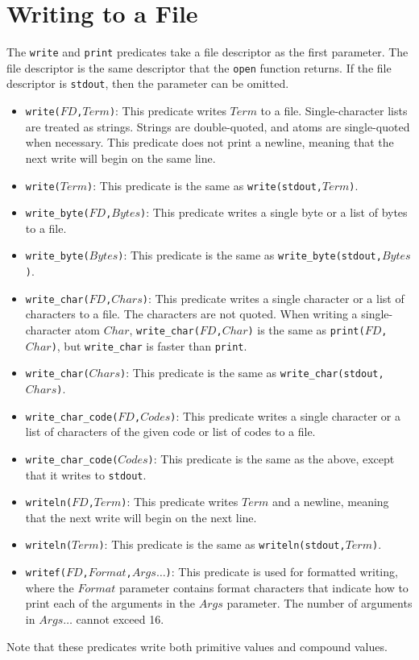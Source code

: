 \section{Writing to a File}
The \texttt{write} and \texttt{print} predicates take a file descriptor as the first parameter.  The file descriptor is the same descriptor that the \texttt{open} function returns. If the file descriptor is \texttt{stdout}, then the parameter can be omitted.
\begin{itemize}
\item \texttt{write($FD$,$Term$)}: This predicate writes $Term$ to a file.  Single-character lists are treated as strings.  Strings are double-quoted, and atoms are single-quoted when necessary.  This predicate does not print a newline, meaning that the next write will begin on the same line.
\item \texttt{write($Term$)}: This predicate is the same as \texttt{write(stdout,$Term$)}.
\item \texttt{write\_byte($FD$,$Bytes$)}: This predicate writes a single byte or a list of bytes to a file.
\item \texttt{write\_byte($Bytes$)}: This predicate is the same as \texttt{write\_byte(stdout,$Bytes$)}.
\item \texttt{write\_char($FD$,$Chars$)}: This predicate writes a single character or a list of characters to a file. The characters are not quoted. When writing a single-character atom $Char$, \texttt{write\_char($FD$,$Char$)} is the same as \texttt{print($FD$,$Char$)}, but \texttt{write\_char} is faster than \texttt{print}.
\item \texttt{write\_char($Chars$)}: This predicate is the same as \texttt{write\_char(stdout,$Chars$)}.
\item \texttt{write\_char\_code($FD$,$Codes$)}: This predicate writes a single character or a list of characters of the given code or list of codes to a file.
\item \texttt{write\_char\_code($Codes$)}: This predicate is the same as the above, except that it writes to \texttt{stdout}.

\item \texttt{writeln($FD$,$Term$)}: This predicate writes $Term$ and a newline, meaning that the next write will begin on the next line.
\item \texttt{writeln($Term$)}: This predicate is the same as \texttt{writeln(stdout,$Term$)}.
\item \texttt{writef($FD$,$Format$,$Args\ldots$)}: This predicate is used for formatted writing, where the $Format$ parameter contains format characters that indicate how to print each of the arguments in the $Args$ parameter. The number of arguments in $Args\ldots$ cannot exceed 16.
\end{itemize}
Note that these predicates write both primitive values and compound values.

